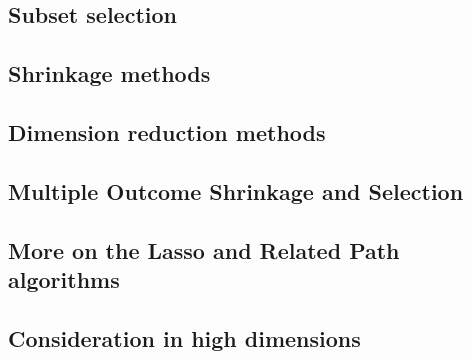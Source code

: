 \subsection{Subset selection}

\subsection{Shrinkage methods}

\subsection{Dimension reduction methods}

\subsection{Multiple Outcome Shrinkage and Selection}

\subsection{More on the Lasso and Related Path algorithms}

\subsection{Consideration in high dimensions}

%
%
